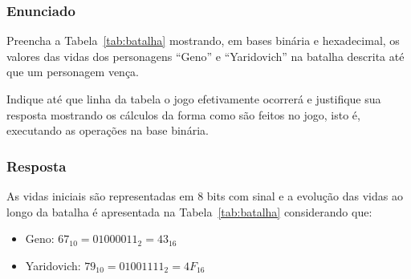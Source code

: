 \documentclass[12pt]{article}
\begin{document}
\subsubsection*{Enunciado}

Preencha a Tabela~\ref{tab:batalha} mostrando, em bases binária e
hexadecimal, os valores das vidas dos personagens ``Geno'' e
``Yaridovich'' na batalha descrita até que um personagem vença.

Indique até que linha da tabela o jogo efetivamente ocorrerá e
justifique sua resposta mostrando os cálculos da forma como são
feitos no jogo, isto é, executando as operações na base binária.

\subsubsection*{Resposta}
As vidas iniciais são representadas em $8$ bits com sinal e a evolução das vidas ao longo da batalha é apresentada na
Tabela~\ref{tab:batalha} considerando que:

\begin{itemize}
\item Geno: $67_{10} = 01000011_2 = 43_{16}$
\item Yaridovich: $79_{10} = 01001111_2 = 4F_{16}$
\end{itemize}

\end{document}

